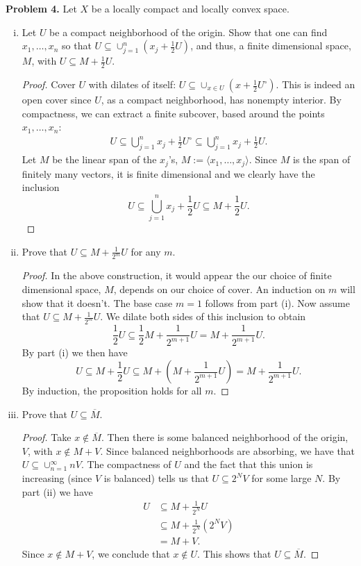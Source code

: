 \documentclass[11pt,letterpaper]{report}
\begin{document}
\noindent\textbf{Problem 4. }
Let $X$ be a locally compact and locally convex space.
\begin{enumerate}[(i)]
	\item Let $U$ be a compact neighborhood of the origin. Show that one can find $x_1, \ldots, x_n$ so that $U\subseteq \cup_{j=1}^n(x_j + \frac{1}{2}U)$, and thus, a finite dimensional space, $M$, with $U\subseteq M+\frac{1}{2}U$.
	\begin{proof}
		Cover $U$ with dilates of itself: $U\subseteq \cup_{x\in U}(x+\frac{1}{2}U^\circ)$. This is indeed an open cover since $U$, as a compact neighborhood, has nonempty interior. By compactness, we can extract a finite subcover, based around the points $x_1, \ldots, x_n$:
		\begin{align*}
			U \subseteq \bigcup_{j=1}^nx_j+\frac{1}{2}U^\circ\subseteq \bigcup_{j=1}^nx_j+\frac{1}{2}U.
		\end{align*}
		Let $M$ be the linear span of the $x_j$'s, $M:= \langle x_1, \ldots, x_j\rangle$. Since $M$ is the span of finitely many vectors, it is finite dimensional and we clearly have the inclusion
		\[
		U\subseteq \bigcup_{j=1}^nx_j+\frac{1}{2}U\subseteq M+\frac{1}{2}U.
		\] 
	\end{proof}

	\item Prove that $U\subseteq M+\frac{1}{2^m}U$ for any $m$.
	\begin{proof}
		In the above construction, it would appear the our choice of finite dimensional space, $M$, depends on our choice of cover. An induction on $m$ will show that it doesn't. The base case $m=1$ follows from part (i). Now assume that $U\subseteq M+\frac{1}{2^m}U$. We dilate both sides of this inclusion to obtain
		\[
		\frac{1}{2}U\subseteq \frac{1}{2}M + \frac{1}{2^{m+1}}U = M+\frac{1}{2^{m+1}}U.
		\]
		By part (i) we then have
		\[
		U\subseteq M+\frac{1}{2}U\subseteq M + \left(M + \frac{1}{2^{m+1}}U\right) = M +\frac{1}{2^{m+1}}U.
		\]
		By induction, the proposition holds for all $m$.
	\end{proof}

	\item Prove that $U\subseteq \overline{M}$.
	\begin{proof}
		Take $x\notin \overline{M}$. Then there is some balanced neighborhood of the origin, $V$, with $x\notin M+V$. Since balanced neighborhoods are absorbing, we have that $U\subseteq \cup_{n=1}^\infty nV$. The compactness of $U$ and the fact that this union is increasing (since $V$ is balanced) tells us that $U\subseteq 2^NV$ for some large $N$. By part (ii) we have
		\begin{align*}
		U &\subseteq M+\frac{1}{2^N}U\\
		&\subseteq M+\frac{1}{2^N}(2^NV)\\
		&= M+V.
		\end{align*}
		Since $x\notin M+V$, we conclude that $x\notin U$. This shows that $U\subseteq \overline{M}$.
	\end{proof}


\end{enumerate}
\end{document}
